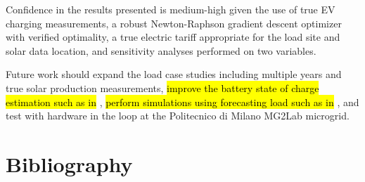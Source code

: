 \documentclass[journal,article,submit,pdftex,moreauthors]{Definitions/mdpi}
\begin{document}
Confidence in the results presented is medium-high given the use of true EV charging measurements, a robust Newton-Raphson gradient descent optimizer with verified optimality, a true electric tariff appropriate for the load site and solar data location, and sensitivity analyses performed on two variables.

Future work should expand the load case studies including multiple years and true solar production measurements, \hl{improve the battery state of charge estimation such as in} \cite{Eleftheriadis2023}, \hl{perform simulations using forecasting load such as in} \cite{Wood2023}, and test with hardware in the loop at the Politecnico di Milano MG2Lab microgrid.

\section{Bibliography}\label{bibliography}


\end{document}
